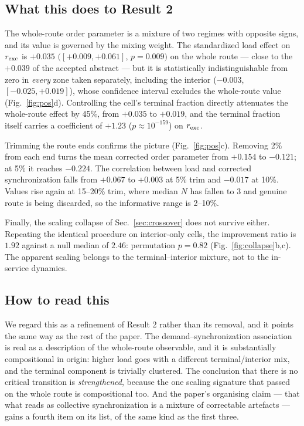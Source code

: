 \documentclass[9pt,twocolumn,twoside]{opticajnl}
\begin{document}
\subsection{What this does to Result 2}

The whole-route order parameter is a mixture of two regimes with opposite signs, and its value
is governed by the mixing weight. The standardized load effect on $r_{\rm exc}$ is $+0.035$
$([+0.009, +0.061]$, $p = 0.009)$ on the whole route --- close to the $+0.039$ of the accepted
abstract --- but it is statistically indistinguishable from zero in \emph{every} zone taken
separately, including the interior ($-0.003$, $[-0.025, +0.019]$), whose confidence interval
excludes the whole-route value (Fig.~\ref{fig:pos}d). Controlling the cell's terminal fraction
directly attenuates the whole-route effect by 45\%, from $+0.035$ to $+0.019$, and the terminal
fraction itself carries a coefficient of $+1.23$ ($p \approx 10^{-159}$) on $r_{\rm exc}$.

Trimming the route ends confirms the picture (Fig.~\ref{fig:pos}c). Removing 2\% from each end
turns the mean corrected order parameter from $+0.154$ to $-0.121$; at 5\% it reaches $-0.224$.
The correlation between load and corrected synchronization falls from $+0.067$ to $+0.003$ at
5\% trim and $-0.017$ at 10\%. Values rise again at 15--20\% trim, where median $N$ has fallen to
3 and genuine route is being discarded, so the informative range is 2--10\%.

Finally, the scaling collapse of Sec.~\ref{sec:crossover} does not survive either. Repeating the
identical procedure on interior-only cells, the improvement ratio is $1.92$ against a null median
of $2.46$: permutation $p = 0.82$ (Fig.~\ref{fig:collapse}b,c). The apparent scaling belongs to
the terminal--interior mixture, not to the in-service dynamics.

\subsection{How to read this}

We regard this as a refinement of Result 2 rather than its removal, and it points the same way
as the rest of the paper. The demand--synchronization association is real as a description of
the whole-route observable, and it is substantially compositional in origin: higher load goes
with a different terminal/interior mix, and the terminal component is trivially clustered. The
conclusion that there is no critical transition is \emph{strengthened}, because the one scaling
signature that passed on the whole route is compositional too. And the paper's organising claim
--- that what reads as collective synchronization is a mixture of correctable artefacts --- gains
a fourth item on its list, of the same kind as the first three.
\end{document}
